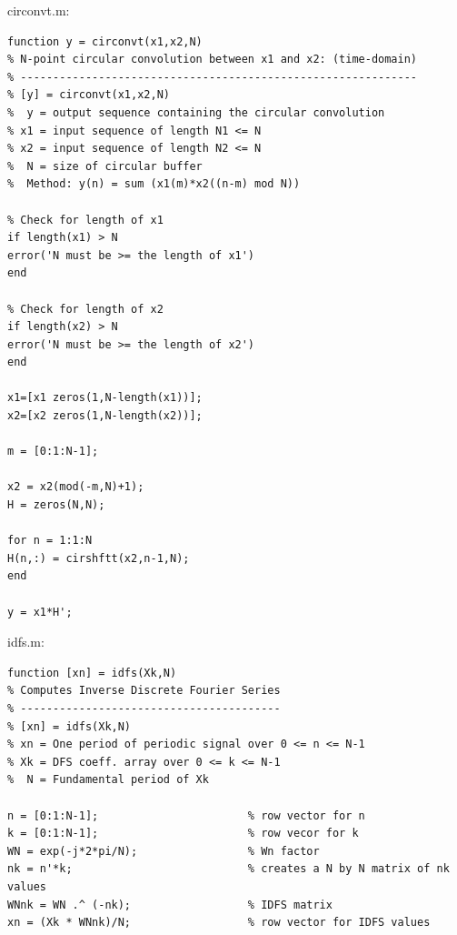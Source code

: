 \documentclass[11pt
  , a4paper
  , article
  , oneside
]{memoir}
\begin{document}
circonvt.m:
\begin{lstlisting}[style=termstyle]
function y = circonvt(x1,x2,N)
% N-point circular convolution between x1 and x2: (time-domain)
% -------------------------------------------------------------
% [y] = circonvt(x1,x2,N)
%  y = output sequence containing the circular convolution
% x1 = input sequence of length N1 <= N
% x2 = input sequence of length N2 <= N
%  N = size of circular buffer
%  Method: y(n) = sum (x1(m)*x2((n-m) mod N))

% Check for length of x1
if length(x1) > N
error('N must be >= the length of x1')
end

% Check for length of x2
if length(x2) > N
error('N must be >= the length of x2')
end

x1=[x1 zeros(1,N-length(x1))];
x2=[x2 zeros(1,N-length(x2))];

m = [0:1:N-1];

x2 = x2(mod(-m,N)+1);
H = zeros(N,N);

for n = 1:1:N
H(n,:) = cirshftt(x2,n-1,N);
end

y = x1*H';
\end{lstlisting}

idfs.m:
\begin{lstlisting}[style=termstyle]
function [xn] = idfs(Xk,N)
% Computes Inverse Discrete Fourier Series
% ----------------------------------------
% [xn] = idfs(Xk,N)
% xn = One period of periodic signal over 0 <= n <= N-1
% Xk = DFS coeff. array over 0 <= k <= N-1
%  N = Fundamental period of Xk

n = [0:1:N-1];                       % row vector for n
k = [0:1:N-1];                       % row vecor for k
WN = exp(-j*2*pi/N);                 % Wn factor
nk = n'*k;                           % creates a N by N matrix of nk values
WNnk = WN .^ (-nk);                  % IDFS matrix
xn = (Xk * WNnk)/N;                  % row vector for IDFS values
\end{lstlisting}
\end{document}

